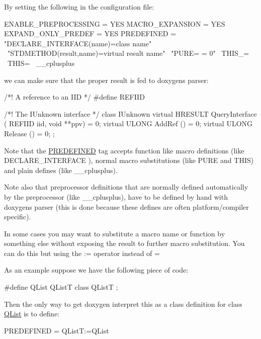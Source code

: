 By setting the following in the configuration file\+:

\begin{DoxyVerb}ENABLE_PREPROCESSING = YES
MACRO_EXPANSION      = YES
EXPAND_ONLY_PREDEF   = YES
PREDEFINED           = "DECLARE_INTERFACE(name)=class name" \
                       "STDMETHOD(result,name)=virtual result name" \
                       "PURE= = 0" \
                       THIS_= \
                       THIS= \
               __cplusplus
\end{DoxyVerb}


we can make sure that the proper result is fed to doxygen\textquotesingle{}s parser\+: \begin{DoxyVerb}/*! A reference to an IID */
#define REFIID

/*! The IUnknown interface */
class  IUnknown
{
  virtual  HRESULT   QueryInterface ( REFIID iid, void **ppv) = 0;
  virtual  ULONG   AddRef () = 0;
  virtual  ULONG   Release () = 0;
};
\end{DoxyVerb}


Note that the \mbox{\hyperlink{config_cfg_predefined}{P\+R\+E\+D\+E\+F\+I\+N\+ED}} tag accepts function like macro definitions (like {\ttfamily D\+E\+C\+L\+A\+R\+E\+\_\+\+I\+N\+T\+E\+R\+F\+A\+CE} ), normal macro substitutions (like {\ttfamily P\+U\+RE} and {\ttfamily T\+H\+IS}) and plain defines (like {\ttfamily \+\_\+\+\_\+cplusplus}).

Note also that preprocessor definitions that are normally defined automatically by the preprocessor (like {\ttfamily \+\_\+\+\_\+cplusplus}), have to be defined by hand with doxygen\textquotesingle{}s parser (this is done because these defines are often platform/compiler specific).

In some cases you may want to substitute a macro name or function by something else without exposing the result to further macro substitution. You can do this but using the {\ttfamily \+:=} operator instead of {\ttfamily =}

As an example suppose we have the following piece of code\+: \begin{DoxyVerb}#define QList QListT
class QListT
{
};
\end{DoxyVerb}


Then the only way to get doxygen interpret this as a class definition for class {\ttfamily \mbox{\hyperlink{class_q_list}{Q\+List}}} is to define\+: \begin{DoxyVerb}PREDEFINED = QListT:=QList
\end{DoxyVerb}


